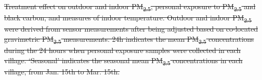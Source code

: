 \documentclass[
  letterpaper,
  DIV=11,
  numbers=noendperiod]{scrartcl}
\makeatletter
\renewenvironment{table}%
   {\renewcommand\familydefault\sfdefault
    \@float{table}}
   {\end@float}
\providecommand{\DIFdeltex}[1]{{\protect\color{red}\sout{#1}}}                      %
\providecommand{\DIFdelbegin}{} %
\providecommand{\DIFdelend}{} %
\providecommand{\DIFdelFL}[1]{\DIFdel{#1}} %
\providecommand{\DIFdelbeginFL}{} %
\providecommand{\DIFdelendFL}{} %
\providecommand{\DIFdel}[1]{\texorpdfstring{\DIFdeltex{#1}}{}} %
\newcommand{\DIFscaledelfig}{0.5}
\newlength{\DIFdelgraphicswidth} %
\newlength{\DIFdelgraphicsheight} %
\newcommand{\DIFdelincludegraphics}[2][]{%
\sbox{\DIFdelgraphicsbox}{\DIFOincludegraphics[#1]{#2}}%
\settoboxwidth{\DIFdelgraphicswidth}{\DIFdelgraphicsbox} %
\settoboxtotalheight{\DIFdelgraphicsheight}{\DIFdelgraphicsbox} %
\scalebox{\DIFscaledelfig}{%
\parbox[b]{\DIFdelgraphicswidth}{\usebox{\DIFdelgraphicsbox}\\[-\baselineskip] \rule{\DIFdelgraphicswidth}{0em}}\llap{\resizebox{\DIFdelgraphicswidth}{\DIFdelgraphicsheight}{%
\setlength{\unitlength}{\DIFdelgraphicswidth}%
\begin{picture}(1,1)%
\thicklines\linethickness{2pt} %
{\color[rgb]{1,0,0}\put(0,0){\framebox(1,1){}}}%
{\color[rgb]{1,0,0}\put(0,0){\line( 1,1){1}}}%
{\color[rgb]{1,0,0}\put(0,1){\line(1,-1){1}}}%
\end{picture}%
}\hspace*{3pt}}} %
} %
\DeclareRobustCommand{\DIFdelbegin}{\DIFOdelbegin \let\includegraphics\DIFdelincludegraphics} %
\DeclareRobustCommand{\DIFdelend}{\DIFOaddend \let\includegraphics\DIFOincludegraphics} %
\DeclareRobustCommand{\DIFdelbeginFL}{\DIFOdelbeginFL \let\includegraphics\DIFdelincludegraphics} %
\DeclareRobustCommand{\DIFdelendFL}{\DIFOaddendFL \let\includegraphics\DIFOincludegraphics} %
\makeatother
\begin{document}
\DIFdelbegin %
\DIFdelend \begin{table}
\DIFdelbeginFL %
{%
\DIFdelFL{Treatment effect on outdoor and indoor PM\textsubscript{2.5}, personal
exposure to PM\textsubscript{2.5} and black carbon, and measures of
indoor temperature. Outdoor and indoor PM\textsubscript{2.5} were
derived from sensor measurements after being adjusted based on
co-located gravimetric PM\textsubscript{2.5} measurements. 24h indicates
the mean PM\textsubscript{2.5} concentrations during the 24 hours when
personal exposure samples were collected in each village. `Seasonal'
indicates the seasonal mean PM\textsubscript{2.5} concentrations in each
village, from Jan. 15th to Mar. 15th. }}%
\DIFdelendFL 


\end{table}
\end{document}
